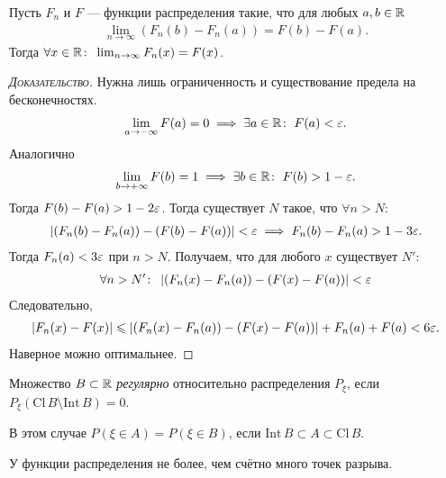 \documentclass[../main.tex]{subfiles}
\begin{document}
\begin{remrk}
	\label{remrk:lim_f_n_using_f_n_a_minnus_f_n_b}
 Пусть $ F_n $ и $ F $ --- функции распределения такие, что для любых $ a, b \in \mathbb{R} $
 \begin{align*}
  \lim_{n \to \infty} (F_n(b) - F_n(a)) = F(b)  - F(a).
 \end{align*} Тогда $ \forall x \in \mathbb{R} \colon\; \lim_{n \to \infty}  F_n(x) = F(x)$.
\end{remrk}
\begin{proof}[\normalfont\textsc{Доказательство}]
 Нужна лишь ограниченность и существование предела на бесконечностях.
 \begin{align*}
  \lim_{a \to -\infty}  F(a) = 0 \implies \exists a \in \mathbb{R} \colon\;  F(a) < \varepsilon.
 \end{align*} Аналогично
 \begin{align*}
  \lim_{b \to +\infty} F(b) = 1 \implies \exists b \in \mathbb{R} \colon\; F(b) > 1 - \varepsilon. 
 \end{align*} Тогда $ F(b) - F(a) > 1 -2\varepsilon $. Тогда существует $ N $ такое, что $ \forall n > N \colon\;  $
 \begin{align*}
  \left|(F_n(b) - F_n(a)) - (F(b)-F(a)) \right| < \varepsilon \implies F_n(b) - F_n(a) > 1 - 3\varepsilon. 
 \end{align*} Тогда $ F_n(a) < 3\varepsilon $ при $ n > N $. Получаем, что для любого $ x $ существует $ N' $:
 \begin{align*}
  \forall n > N' \colon\; \left|(F_n(x) - F_n(a)) - (F(x)-F(a)) \right| < \varepsilon
 \end{align*} Следовательно,
 \begin{align*}
  \left|F_n(x) - F(x) \right| \leqslant \left| (F_n(x) - F_n(a)) - (F(x) - F(a)) \right| + F_n(a) + F(a) < 6\varepsilon.
 \end{align*} Наверное можно оптимальнее.
\end{proof}

\begin{df}
 Множество $ B \subset \mathbb{R} $ \textit{регулярно} относительно распределения $ P_\xi $, если $ P_\xi(\mathrm{Cl}\,B \setminus \mathrm{Int}\,B) = 0 $.
\end{df}

В этом случае $ P(\xi \in A) = P(\xi \in B) $, если $ \mathrm{Int}\,B \subset A \subset \mathrm{Cl}\,B $.

\begin{prop*}
 У функции распределения не более, чем счётно много точек разрыва.
\end{prop*}
\end{document}
